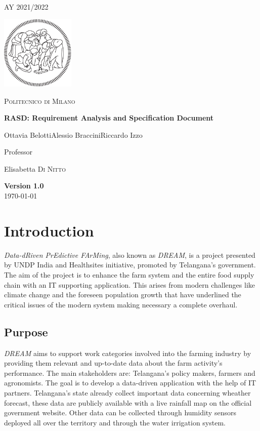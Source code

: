 \documentclass[table, 12pt]{article}
\begin{document}
\begin{titlepage}
    \centering
    {\scshape\large AY 2021/2022 \par}
    \vfill
    \includegraphics[width=100pt]{assets/logo-polimi-new}\par\vspace{1cm}
    {\scshape\LARGE Politecnico di Milano \par}
    \vspace{1.5cm}
    {\huge\bfseries RASD\@: Requirement Analysis
        and Specification Document \par}
    \vspace{2cm}
    {\Large {Ottavia Belotti\quad Alessio Braccini\quad Riccardo Izzo}\par}
    \vfill
    {\large Professor\par
        Elisabetta \textsc{Di Nitto}}
    \vfill
    {\large \textbf{Version 1.0}\\ \today \par}
\end{titlepage}


\thispagestyle{plain}
\mbox{}
\newpage
{}
\tableofcontents
\newpage
{}

\section{Introduction}
\emph{Data-dRiven PrEdictive FArMing}, also known as \emph{DREAM}, is a project presented by UNDP India and Healthsites initiative, promoted by Telangana's government.
The aim of the project is to enhance the farm system and the entire food supply chain with an IT supporting application. 
This arises from modern challenges like climate change and the foreseen population growth that have underlined the critical issues of the modern system making necessary a complete overhaul.


\subsection{Purpose} %
\emph{DREAM} aims to support work categories involved into the farming industry by providing them relevant and up-to-date data about the farm activity's performance. 
The main stakeholders are: Telangana's policy makers, farmers and agronomists.
The goal is to develop a data-driven application with the help of IT partners.
Telangana's state already collect important data concerning wheather forecast, these data are publicly available with a live rainfall map on the official government website.
Other data can be collected through humidity sensors deployed all over the territory and through the water irrigation system.
\end{document}
